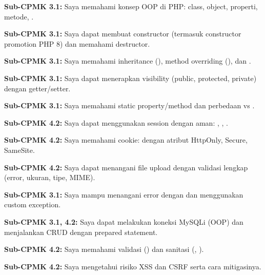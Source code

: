 \documentclass[../main.tex]{subfiles}
\begin{document}
\begin{checklist}
  \item \textbf{Sub-CPMK 3.1:} Saya memahami konsep OOP di PHP: class, object, properti, metode, .
  \item \textbf{Sub-CPMK 3.1:} Saya dapat membuat constructor (termasuk constructor promotion PHP 8) dan memahami destructor.
  \item \textbf{Sub-CPMK 3.1:} Saya memahami inheritance (), method overriding (), dan .
  \item \textbf{Sub-CPMK 3.1:} Saya dapat menerapkan visibility (public, protected, private) dengan getter/setter.
  \item \textbf{Sub-CPMK 3.1:} Saya memahami static property/method dan perbedaan  vs .
  \item \textbf{Sub-CPMK 4.2:} Saya dapat menggunakan session dengan aman: , , .
  \item \textbf{Sub-CPMK 4.2:} Saya memahami cookie:  dengan atribut HttpOnly, Secure, SameSite.
  \item \textbf{Sub-CPMK 4.2:} Saya dapat menangani file upload dengan validasi lengkap (error, ukuran, tipe, MIME).
  \item \textbf{Sub-CPMK 3.1:} Saya mampu menangani error dengan  dan menggunakan custom exception.
  \item \textbf{Sub-CPMK 3.1, 4.2:} Saya dapat melakukan koneksi MySQLi (OOP) dan menjalankan CRUD dengan prepared statement.
  \item \textbf{Sub-CPMK 4.2:} Saya memahami validasi () dan sanitasi (, ).
  \item \textbf{Sub-CPMK 4.2:} Saya mengetahui risiko XSS dan CSRF serta cara mitigasinya.
\end{checklist}
\end{document}
